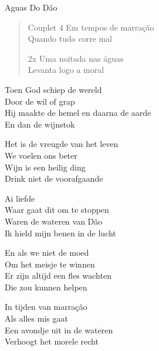 \begin{song}[huayno]{Aguas Do Dão}
\begin{verse}{Couplet 4}
Em tempos de marração\\ 
Quando tudo corre mal \\
\begin{sidenote}{2x}
Uma noitada nas águas \\
Levanta logo a moral \\
\end{sidenote}
\end{verse}


\end{song}

\begin{translation}
Toen God schiep de wereld\\
Door de wil of grap\\
Hij maakte de hemel en daarna de aarde\\
En dan de wijnstok\vspace{2.1ex}

Het is de vreugde van het leven\\
We voelen ons beter\\
Wijn is een heilig ding\\
Drink niet de voorafgaande\vspace{2.1ex}

Ai liefde\\
Waar gaat dit om te stoppen\\
Waren de wateren van Dão\\
Ik hield mijn benen in de lucht\vspace{2.1ex}

En als we niet de moed\\
Om het meisje te winnen\\
Er zijn altijd een fles wachten\\
Die zou kunnen helpen\vspace{2.1ex}

In tijden van marração\\
Als alles mis gaat\\
Een avondje uit in de wateren\\
Verhoogt het morele recht
\end{translation}
